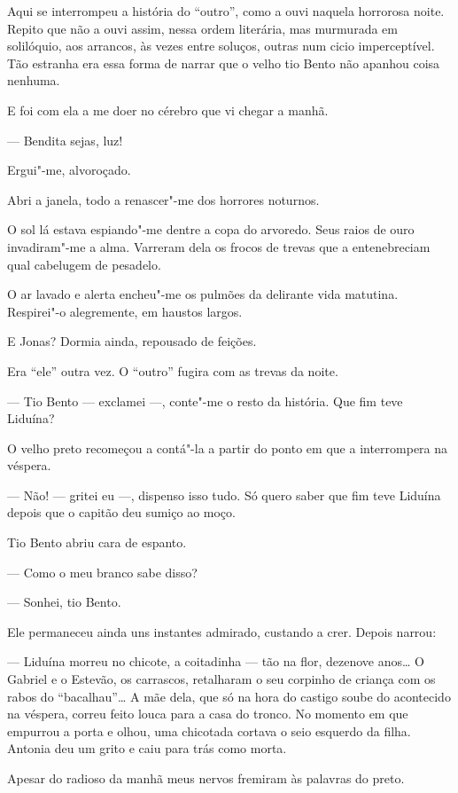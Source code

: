Aqui se interrompeu a história do ``outro'', como a ouvi naquela
horrorosa noite. Repito que não a ouvi assim, nessa ordem literária, mas
murmurada em solilóquio, aos arrancos, às vezes entre soluços, outras
num cicio imperceptível. Tão estranha era essa forma de narrar que o
velho tio Bento não apanhou coisa nenhuma.

E foi com ela a me doer no cérebro que vi chegar a manhã.

--- Bendita sejas, luz!

Ergui"-me, alvoroçado.

Abri a janela, todo a renascer"-me dos horrores noturnos.

O sol lá estava espiando"-me dentre a copa do arvoredo. Seus raios de
ouro invadiram"-me a alma. Varreram dela os frocos de trevas que a
entenebreciam qual cabelugem de pesadelo.

O ar lavado e alerta encheu"-me os pulmões da delirante vida matutina.
Respirei"-o alegremente, em haustos largos.

E Jonas? Dormia ainda, repousado de feições.

Era ``ele'' outra vez. O ``outro'' fugira com as trevas da noite.

--- Tio Bento --- exclamei ---, conte"-me o resto da história. Que fim
teve Liduína?

O velho preto recomeçou a contá"-la a partir do ponto em que a
interrompera na véspera.

--- Não! --- gritei eu ---, dispenso isso tudo. Só quero saber que fim
teve Liduína depois que o capitão deu sumiço ao moço.

Tio Bento abriu cara de espanto.

--- Como o meu branco sabe disso?

--- Sonhei, tio Bento.

Ele permaneceu ainda uns instantes admirado, custando a crer. Depois
narrou:

--- Liduína morreu no chicote, a coitadinha --- tão na flor, dezenove
anos\ldots{} O Gabriel e o Estevão, os carrascos, retalharam o seu corpinho
de criança com os rabos do ``bacalhau''\ldots{} A mãe dela, que só na hora do
castigo soube do acontecido na véspera, correu feito louca para a casa
do tronco. No momento em que empurrou a porta e olhou, uma chicotada
cortava o seio esquerdo da filha. Antonia deu um grito e caiu para trás
como morta.

Apesar do radioso da manhã meus nervos fremiram às palavras do preto.


